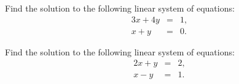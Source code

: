 

\begin{problem}
\item Find the solution to the following linear system of equations:
  \begin{eqnarray*}
    3x + 4y & = & 1, \\
    x + y   & = & 0.
  \end{eqnarray*}
  \vfill

\item Find the solution to the following linear system of equations:
  \begin{eqnarray*}
    2x + y & = &  2, \\
    x - y  & = &  1.
  \end{eqnarray*}
  \vfill

\end{problem}


